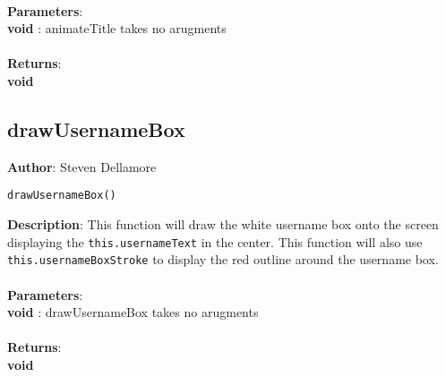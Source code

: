 \documentclass[12pt]{article}
\begin{document}
\textbf{\large{\\Parameters}}:\\
\textbf{void }: animateTitle takes no arugments\\\textbf{\large{\\Returns}}:\\\textbf{void}

\subsection{drawUsernameBox}
\textbf{Author}: Steven Dellamore 
\vspace*{1\baselineskip}
\begin{lstlisting}
drawUsernameBox()
\end{lstlisting} 
\vspace*{1\baselineskip}
\textbf{Description}: This function will draw the white username box onto the screen displaying the \texttt{this.usernameText} in the center. This function will also use \texttt{this.usernameBoxStroke} to display the red outline around the username box. \\


\textbf{\large{\\Parameters}}:\\
\textbf{void }: drawUsernameBox takes no arugments\\\textbf{\large{\\Returns}}:\\\textbf{void}
\end{document}
